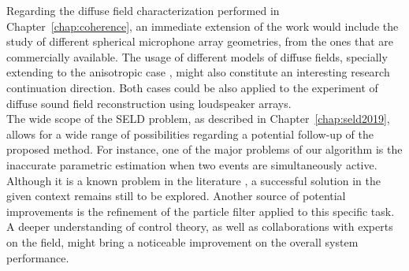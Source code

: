 Regarding the diffuse field characterization performed in Chapter~\ref{chap:coherence}, an immediate extension of the work would include the study of different spherical microphone array geometries, from the ones that are commercially available.
The usage of different models of diffuse fields, specially extending to the anisotropic case \cite{alary2019assessing}, might also constitute an interesting research continuation direction. 
Both cases could be also applied to the experiment of diffuse sound field reconstruction using loudspeaker arrays. \\




The wide scope of the SELD problem, as described in Chapter~\ref{chap:seld2019}, allows for a wide range of possibilities regarding a potential follow-up of the proposed method.
For instance, one of the major problems of our algorithm is the inaccurate parametric estimation when two events are simultaneously active. Although it is a known problem in the literature \cite{epain2016spherical} , a successful solution in the given context remains still to be explored.
\newpage
Another source of potential improvements is the refinement of the particle filter applied to this specific task. A deeper understanding of control theory, as well as collaborations with experts on the field, might bring a noticeable improvement on the overall system performance.

